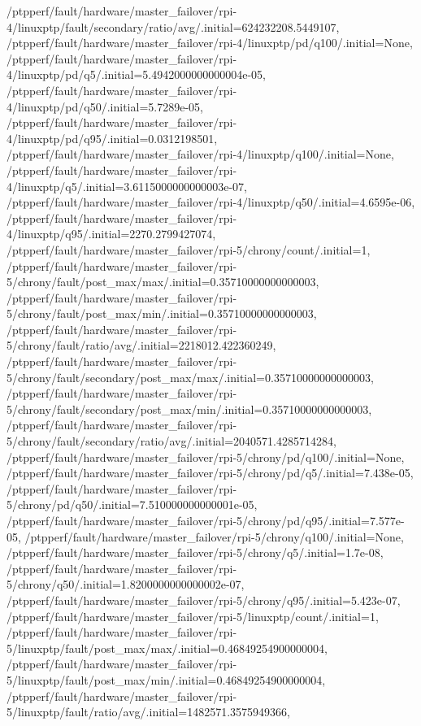 {    /ptpperf/fault/hardware/master_failover/rpi-4/linuxptp/fault/secondary/ratio/avg/.initial=624232208.5449107,
    /ptpperf/fault/hardware/master_failover/rpi-4/linuxptp/pd/q100/.initial=None,
    /ptpperf/fault/hardware/master_failover/rpi-4/linuxptp/pd/q5/.initial=5.4942000000000004e-05,
    /ptpperf/fault/hardware/master_failover/rpi-4/linuxptp/pd/q50/.initial=5.7289e-05,
    /ptpperf/fault/hardware/master_failover/rpi-4/linuxptp/pd/q95/.initial=0.0312198501,
    /ptpperf/fault/hardware/master_failover/rpi-4/linuxptp/q100/.initial=None,
    /ptpperf/fault/hardware/master_failover/rpi-4/linuxptp/q5/.initial=3.6115000000000003e-07,
    /ptpperf/fault/hardware/master_failover/rpi-4/linuxptp/q50/.initial=4.6595e-06,
    /ptpperf/fault/hardware/master_failover/rpi-4/linuxptp/q95/.initial=2270.2799427074,
    /ptpperf/fault/hardware/master_failover/rpi-5/chrony/count/.initial=1,
    /ptpperf/fault/hardware/master_failover/rpi-5/chrony/fault/post_max/max/.initial=0.35710000000000003,
    /ptpperf/fault/hardware/master_failover/rpi-5/chrony/fault/post_max/min/.initial=0.35710000000000003,
    /ptpperf/fault/hardware/master_failover/rpi-5/chrony/fault/ratio/avg/.initial=2218012.422360249,
    /ptpperf/fault/hardware/master_failover/rpi-5/chrony/fault/secondary/post_max/max/.initial=0.35710000000000003,
    /ptpperf/fault/hardware/master_failover/rpi-5/chrony/fault/secondary/post_max/min/.initial=0.35710000000000003,
    /ptpperf/fault/hardware/master_failover/rpi-5/chrony/fault/secondary/ratio/avg/.initial=2040571.4285714284,
    /ptpperf/fault/hardware/master_failover/rpi-5/chrony/pd/q100/.initial=None,
    /ptpperf/fault/hardware/master_failover/rpi-5/chrony/pd/q5/.initial=7.438e-05,
    /ptpperf/fault/hardware/master_failover/rpi-5/chrony/pd/q50/.initial=7.510000000000001e-05,
    /ptpperf/fault/hardware/master_failover/rpi-5/chrony/pd/q95/.initial=7.577e-05,
    /ptpperf/fault/hardware/master_failover/rpi-5/chrony/q100/.initial=None,
    /ptpperf/fault/hardware/master_failover/rpi-5/chrony/q5/.initial=1.7e-08,
    /ptpperf/fault/hardware/master_failover/rpi-5/chrony/q50/.initial=1.8200000000000002e-07,
    /ptpperf/fault/hardware/master_failover/rpi-5/chrony/q95/.initial=5.423e-07,
    /ptpperf/fault/hardware/master_failover/rpi-5/linuxptp/count/.initial=1,
    /ptpperf/fault/hardware/master_failover/rpi-5/linuxptp/fault/post_max/max/.initial=0.46849254900000004,
    /ptpperf/fault/hardware/master_failover/rpi-5/linuxptp/fault/post_max/min/.initial=0.46849254900000004,
    /ptpperf/fault/hardware/master_failover/rpi-5/linuxptp/fault/ratio/avg/.initial=1482571.3575949366,
}
